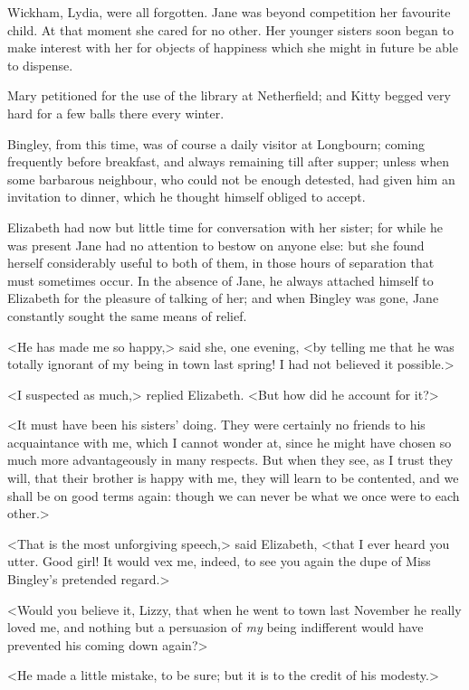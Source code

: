 Wickham, Lydia, were all forgotten. Jane was beyond competition her favourite child. At that moment she cared for no other. Her younger sisters soon began to make interest with her for objects of happiness which she might in future be able to dispense.

Mary petitioned for the use of the library at Netherfield; and Kitty begged very hard for a few balls there every winter.

Bingley, from this time, was of course a daily visitor at Longbourn; coming frequently before breakfast, and always remaining till after supper; unless when some barbarous neighbour, who could not be enough detested, had given him an invitation to dinner, which he thought himself obliged to accept.

Elizabeth had now but little time for conversation with her sister; for while he was present Jane had no attention to bestow on anyone else: but she found herself considerably useful to both of them, in those hours of separation that must sometimes occur. In the absence of Jane, he always attached himself to Elizabeth for the pleasure of talking of her; and when Bingley was gone, Jane constantly sought the same means of relief.

<He has made me so happy,> said she, one evening, <by telling me that he was totally ignorant of my being in town last spring! I had not believed it possible.>

<I suspected as much,> replied Elizabeth. <But how did he account for it?>

<It must have been his sisters' doing. They were certainly no friends to his acquaintance with me, which I cannot wonder at, since he might have chosen so much more advantageously in many respects. But when they see, as I trust they will, that their brother is happy with me, they will learn to be contented, and we shall be on good terms again: though we can never be what we once were to each other.>

<That is the most unforgiving speech,> said Elizabeth, <that I ever heard you utter. Good girl! It would vex me, indeed, to see you again the dupe of Miss Bingley's pretended regard.>

<Would you believe it, Lizzy, that when he went to town last November he really loved me, and nothing but a persuasion of \textit{my} being indifferent would have prevented his coming down again?>

<He made a little mistake, to be sure; but it is to the credit of his modesty.>

